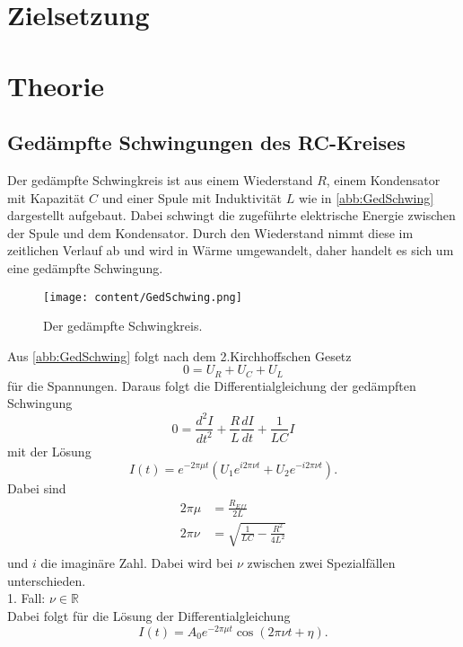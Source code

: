 \section{Zielsetzung}
\label{sec:Zielsetzung}
\section{Theorie}
\label{sec:Theorie}
\subsection{Gedämpfte Schwingungen des RC-Kreises}
Der gedämpfte Schwingkreis ist aus einem Wiederstand $R$, einem Kondensator mit Kapazität $C$ und
einer Spule mit Induktivität $L$ wie in \autoref{abb:GedSchwing} dargestellt aufgebaut. Dabei schwingt
die zugeführte elektrische Energie zwischen der Spule und dem Kondensator. Durch den Wiederstand nimmt diese im zeitlichen
Verlauf ab und wird in Wärme umgewandelt, daher handelt es sich um eine gedämpfte Schwingung.
\begin{figure}[H]
    \centering
    \texttt{[image: content/GedSchwing.png]}
    \caption{Der gedämpfte Schwingkreis. \cite{sample}}
    \label{abb:GedSchwing}
\end{figure}
\noindent Aus \autoref{abb:GedSchwing} folgt nach dem 2.Kirchhoffschen Gesetz
\begin{equation}
    0 = U_R + U_C + U_L
\end{equation}
für die Spannungen.
Daraus folgt die Differentialgleichung der gedämpften Schwingung
\begin{equation*}
    0 = \frac{d^2 I}{dt^2} + \frac{R}{L}\frac{dI}{dt} + \frac{1}{LC}I
\end{equation*}
mit der Lösung
\begin{equation}
    \label{eqn:AllgLoes}
    I(t) = e^{-2\pi\mu t}\left(U_1e^{i2\pi\nu t} + U_2e^{-i2\pi\nu t}\right).
\end{equation}
Dabei sind
\begin{align}
   2\pi\mu &= \frac{R_{Eff}}{2L}\\
   2\pi\nu &= \sqrt{\frac{1}{LC} - \frac{R^2}{4L^2}}\\
\end{align}
und $i$ die imaginäre Zahl.
Dabei wird bei $\nu$ zwischen zwei Spezialfällen unterschieden.\\
1. Fall: $\nu\in\mathbb{R}$\\
Dabei folgt für die Lösung der Differentialgleichung
\begin{equation}
    I(t) = A_0e^{-2\pi\mu t}\cos(2\pi\nu t + \eta).
\end{equation}
